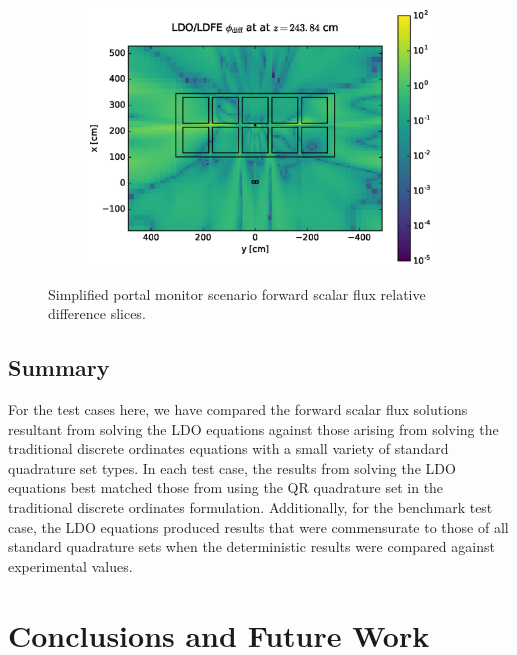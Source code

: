 \documentclass{article} %
\begin{document}
\begin{figure}[!htb]
\ContinuedFloat
\begin{subfigure}{\textwidth}
\centering
\includegraphics[max height=0.445\textheight]
{img/portal-flux-diff-ldfe.eps}
\end{subfigure}
\caption{Simplified portal monitor scenario forward scalar flux relative
         difference slices.}
\label{cargo-fwd-diff-rel}
\end{figure}

\FloatBarrier
\subsection{Summary}

For the test cases here, we have compared the forward scalar flux solutions
resultant from solving the LDO equations against those arising from solving the
traditional discrete ordinates equations with a small variety of standard
quadrature set types. In
each test case, the results from solving the LDO equations best matched those
from using the QR quadrature set in the traditional discrete ordinates
formulation. Additionally, for the benchmark test case, the LDO equations
produced results that were commensurate to those of all standard quadrature
sets when the deterministic results were compared against experimental values.

\section{Conclusions and Future Work}
\label{sec:conclusions}
\end{document}
